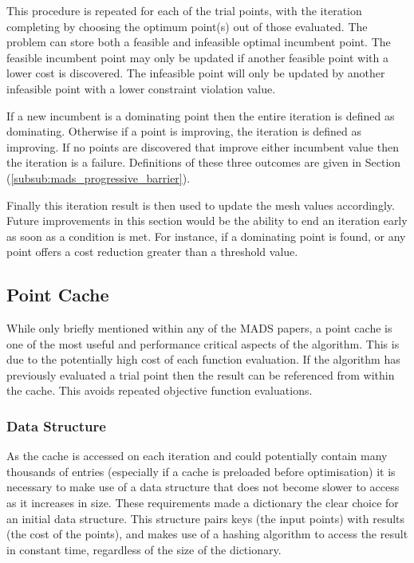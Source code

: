 This procedure is repeated for each of the trial points, with the iteration completing by choosing the optimum point(s) out of those evaluated. The problem can store both a feasible and infeasible optimal incumbent point. The feasible incumbent point may only be updated if another feasible point with a lower cost is discovered. The infeasible point will only be updated by another infeasible point with a lower constraint violation value.

If a new incumbent is a dominating point then the entire iteration is defined as dominating. Otherwise if a point is improving, the iteration is defined as improving.  If no points are discovered that improve either incumbent value then the iteration is a failure. Definitions of these three outcomes are given in Section (\ref{subsub:mads_progressive_barrier}).

Finally this iteration result is then used to update the mesh values accordingly. Future improvements in this section would be the ability to end an iteration early as soon as a condition is met. For instance, if a dominating point is found, or any point offers a cost reduction greater than a threshold value.

\subsection{Point Cache}\label{sub:ds_cache}
While only briefly mentioned within any of the MADS papers, a point cache is one of the most useful and performance critical aspects of the algorithm. This is due to the potentially high cost of each function evaluation. If the algorithm has previously evaluated a trial point then the result can be referenced from within the cache. This avoids repeated objective function evaluations.

\subsubsection{Data Structure}
As the cache is accessed on each iteration and could potentially contain many thousands of entries (especially if a cache is preloaded before optimisation) it is necessary to make use of a data structure that does not become slower to access as it increases in size. These requirements made a dictionary the clear choice for an initial data structure. This structure pairs keys (the input points) with results (the cost of the points), and makes use of a hashing algorithm to access the result in constant time, regardless of the size of the dictionary. 

